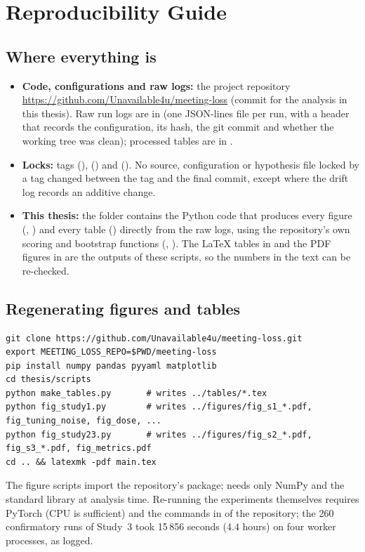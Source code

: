 \chapter{Reproducibility Guide}\label{app:reproducibility}

\section{Where everything is}
\begin{itemize}
\item \textbf{Code, configurations and raw logs:} the project repository \url{https://github.com/Unavailable4u/meeting-loss} (commit \code{\repocommit} for the analysis in this thesis). Raw run logs are in  (one JSON-lines file per run, with a header that records the configuration, its hash, the git commit and whether the working tree was clean); processed tables are in .
\item \textbf{Locks:} tags  (),  () and  (). No source, configuration or hypothesis file locked by a tag changed between the tag and the final commit, except where the drift log records an additive change.
\item \textbf{This thesis:} the  folder contains the Python code that produces every figure (, ) and every table () directly from the raw logs, using the repository's own scoring and bootstrap functions (, ). The \LaTeX{} tables in  and the PDF figures in  are the outputs of these scripts, so the numbers in the text can be re-checked.
\end{itemize}

\section{Regenerating figures and tables}
\begin{lstlisting}
git clone https://github.com/Unavailable4u/meeting-loss.git
export MEETING_LOSS_REPO=$PWD/meeting-loss
pip install numpy pandas pyyaml matplotlib
cd thesis/scripts
python make_tables.py       # writes ../tables/*.tex
python fig_study1.py        # writes ../figures/fig_s1_*.pdf, fig_tuning_noise, fig_dose, ...
python fig_study23.py       # writes ../figures/fig_s2_*.pdf, fig_s3_*.pdf, fig_metrics.pdf
cd .. && latexmk -pdf main.tex
\end{lstlisting}
The figure scripts import the repository's  package;  needs only NumPy and the standard library at analysis time. Re-running the experiments themselves requires PyTorch (CPU is sufficient) and the commands in  of the repository; the 260 confirmatory runs of Study~3 took 15\,856 seconds ($4.4$ hours) on four worker processes, as logged.


